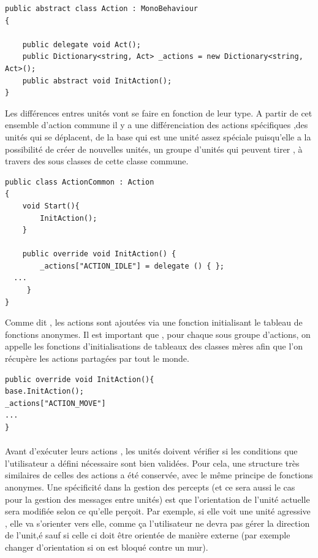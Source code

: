 \documentclass{report}
\begin{document}
\begin{lstlisting}[frame=single]
public abstract class Action : MonoBehaviour
{

    public delegate void Act();
    public Dictionary<string, Act> _actions = new Dictionary<string, Act>();
    public abstract void InitAction();
}
\end{lstlisting}

Les différences entres unités vont se faire en fonction de leur type. A partir de cet ensemble d’action commune il y a une différenciation des actions spécifiques ,des unités qui se déplacent, de la base qui est une unité assez spéciale puisqu’elle a la possibilité de créer de nouvelles unités,  un groupe d’unités qui peuvent tirer , à travers des sous classes de cette classe commune.

\begin{lstlisting}[frame=single]
public class ActionCommon : Action
{
    void Start(){
        InitAction();
    }

    public override void InitAction() {
        _actions["ACTION_IDLE"] = delegate () { };
  ...
     }
}
\end{lstlisting}

Comme dit , les actions sont ajoutées via une fonction initialisant le tableau de fonctions anonymes. Il est important que , pour chaque sous groupe d’actions, on appelle les fonctions d’initialisations de tableaux des classes mères afin que l’on récupère les actions partagées par tout le monde.
\begin{lstlisting}[frame=single]
  public override void InitAction(){
base.InitAction();
_actions["ACTION_MOVE"] 
...
}
\end{lstlisting}

\paragraph{}

Avant d'exécuter leurs actions , les unités doivent vérifier si les conditions que l’utilisateur a défini nécessaire sont bien validées. Pour cela, une structure très similaires de celles des actions a été conservée, avec le même principe de fonctions anonymes. 
Une spécificité dans la gestion des percepts (et ce sera aussi le cas pour la gestion des messages entre unités) est que l’orientation de l’unité actuelle sera modifiée selon ce qu’elle perçoit. Par exemple, si elle voit une unité agressive , elle va s’orienter vers elle, comme ça l’utilisateur ne devra pas gérer la direction de l’unit,é sauf si celle ci doit être orientée de manière externe (par exemple changer d’orientation si on est bloqué contre un mur).
\end{document}
